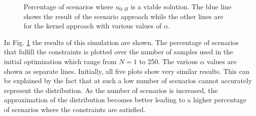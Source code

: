 \begin{figure}[t]
		\def\file{data/AlphaTest_K250_MultipleConstraints_S2_Alpha02.txt}
		
		\centering
		\vspace*{-0.4cm}
		
		\caption{Percentage of scenarios where $u_{0:H}$ is a viable solution. The blue line shows the result of the scenario approach while the other lines are for the kernel approach with various values of $\alpha$.}
		\label{fig:robustness_plot}
\end{figure}


In Fig. \ref{fig:robustness_plot} the results of this simulation are shown. The percentage of scenarios that fulfill the constraints is plotted over the number of samples used in the initial optimization which range from $N = 1$ to 250. The various $\alpha$ values are shown as separate lines. Initially, all five plots show very similar results. This can be explained by the fact that at such a low number of scenarios cannot accurately represent the distribution. As the number of scenarios is increased, the approximation of the distribution becomes better leading to a higher percentage of scenarios where the constraints are satisfied.

